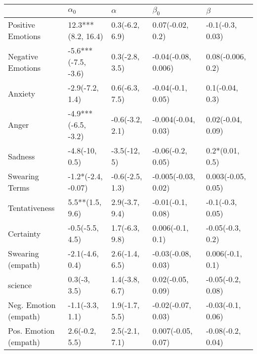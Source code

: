 \begin{tabular}{lllll}
\toprule
{} &           $\alpha_0$ &         $\alpha$ &            $\beta_0$ &             $\beta$ \\
\midrule
Positive Emotions     &   12.3***(8.2, 16.4) &   0.3(-6.2, 6.9) &     0.07(-0.02, 0.2) &    -0.1(-0.3, 0.03) \\
Negative Emotions     &  -5.6***(-7.5, -3.6) &   0.3(-2.8, 3.5) &  -0.04(-0.08, 0.006) &   0.08(-0.006, 0.2) \\
Anxiety               &      -2.9(-7.2, 1.4) &   0.6(-6.3, 7.5) &    -0.04(-0.1, 0.05) &     0.1(-0.04, 0.3) \\
Anger                 &  -4.9***(-6.5, -3.2) &  -0.6(-3.2, 2.1) &  -0.004(-0.04, 0.03) &   0.02(-0.04, 0.09) \\
Sadness               &       -4.8(-10, 0.5) &     -3.5(-12, 5) &    -0.06(-0.2, 0.05) &     0.2*(0.01, 0.5) \\
Swearing Terms        &   -1.2*(-2.4, -0.07) &  -0.6(-2.5, 1.3) &  -0.005(-0.03, 0.02) &  0.003(-0.05, 0.05) \\
Tentativeness         &      5.5**(1.5, 9.6) &   2.9(-3.7, 9.4) &    -0.01(-0.1, 0.08) &    -0.1(-0.3, 0.05) \\
Certainty             &      -0.5(-5.5, 4.5) &   1.7(-6.3, 9.8) &     0.006(-0.1, 0.1) &    -0.05(-0.3, 0.2) \\
Swearing (empath)     &      -2.1(-4.6, 0.4) &   2.6(-1.4, 6.5) &   -0.03(-0.08, 0.03) &    0.006(-0.1, 0.1) \\
science               &         0.3(-3, 3.5) &   1.4(-3.8, 6.7) &    0.02(-0.05, 0.09) &   -0.05(-0.2, 0.08) \\
Neg. Emotion (empath) &      -1.1(-3.3, 1.1) &   1.9(-1.7, 5.5) &   -0.02(-0.07, 0.03) &   -0.03(-0.1, 0.06) \\
Pos. Emotion (empath) &       2.6(-0.2, 5.5) &   2.5(-2.1, 7.1) &   0.007(-0.05, 0.07) &   -0.08(-0.2, 0.04) \\
\bottomrule
\end{tabular}
